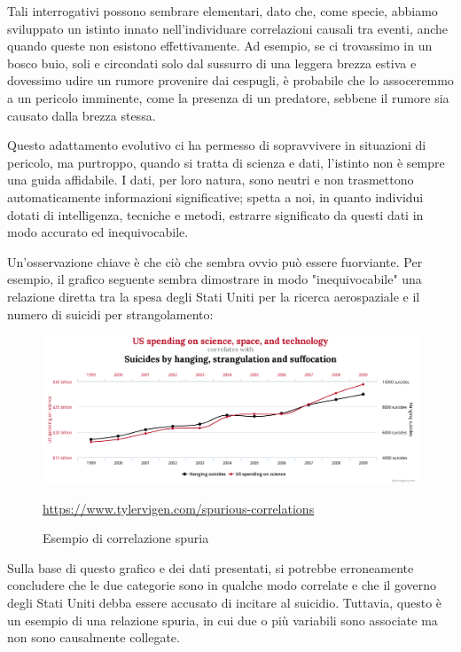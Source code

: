 Tali interrogativi possono sembrare elementari, dato che, come specie, 
abbiamo sviluppato un istinto innato nell'individuare correlazioni 
causali tra eventi, anche quando queste non esistono effettivamente. 
Ad esempio, se ci trovassimo in un bosco buio, soli e circondati 
solo dal sussurro di una leggera brezza estiva e dovessimo udire un 
rumore provenire dai cespugli, è probabile che lo assoceremmo a un 
pericolo imminente, come la presenza di un predatore, sebbene il 
rumore sia causato dalla brezza stessa.

Questo adattamento evolutivo ci ha permesso di sopravvivere in 
situazioni di pericolo, ma purtroppo, quando si tratta di scienza e dati, 
l'istinto non è sempre una guida affidabile. I dati, per loro natura, 
sono neutri e non trasmettono automaticamente informazioni significative; 
spetta a noi, in quanto individui dotati di intelligenza, 
tecniche e metodi, estrarre significato da questi dati in modo accurato 
ed inequivocabile.

Un'osservazione chiave è che ciò che sembra ovvio può essere fuorviante. 
Per esempio, il grafico seguente sembra dimostrare in modo 
"inequivocabile" una relazione diretta tra la spesa degli Stati Uniti 
per la ricerca aerospaziale e il numero di suicidi per strangolamento:

\begin{figure}[H]
    \begin{center}
        \includegraphics[width=\linewidth]{img/chart.png}
        \caption{Esempio di correlazione spuria}
        \url{https://www.tylervigen.com/spurious-correlations}
        \label{fig:spurious_relations}
    \end{center}
\end{figure}

Sulla base di questo grafico e dei dati presentati, si potrebbe 
erroneamente concludere che le due categorie sono in qualche modo 
correlate e che il governo degli Stati Uniti debba essere 
accusato di incitare al suicidio. Tuttavia, questo è un esempio 
di una relazione spuria, in cui due o più variabili sono 
associate ma non sono causalmente collegate.


